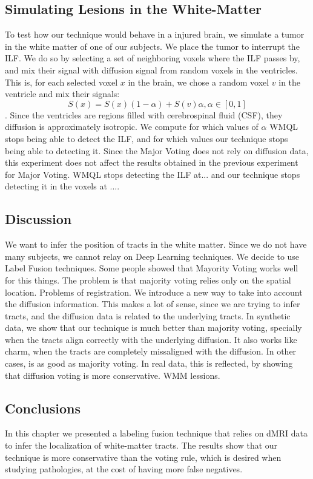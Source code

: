 \subsection{Simulating Lesions in the White-Matter}
To test how our technique would behave in a injured brain, we simulate a tumor in the white matter of one of our subjects. We place the tumor to interrupt the ILF. We do so by selecting a set of neighboring voxels where the ILF passes by, and mix their signal with diffusion signal from random voxels in the ventricles. This is, for each selected voxel $x$ in the brain, we chose a random voxel $v$ in the ventricle and mix their signals:
$$S(x) = S(x)(1-\alpha) + S(v)\alpha, \alpha \in [0,1]$$.
Since the ventricles are regions filled with cerebrospinal fluid (CSF), they diffusion is approximately isotropic. We compute for which values of $\alpha$ WMQL stops being able to detect the ILF, and for which values our technique stops being able to detecting it. Since the Major Voting does not rely on diffusion data, this experiment does not affect the results obtained in the previous experiment for Major Voting.
WMQL stops detecting the ILF at... and our technique stops detecting it in the voxels at .... 

\subsection{Discussion}
We want to infer the position of tracts in the white matter.
Since we do not have many subjects, we cannot relay on Deep Learning techniques.
We decide to use Label Fusion techniques.
Some people showed that Mayority Voting works well for this things.
The problem is that majority voting relies only on the spatial location.
Problems of registration.
We introduce a new way to take into account the diffusion information.
This makes a lot of sense, since we are trying to infer tracts, and the 
diffusion data is related to the underlying tracts.
In synthetic data, we show that our technique is much better than
majority voting, specially when the tracts align correctly with the
underlying diffusion. It also works like charm, when the tracts are completely
missaligned with the diffusion. In other cases, is as good as majority voting.
In real data, this is reflected, by showing that diffusion voting is more
conservative. WMM lessions.

\subsection{Conclusions}
In this chapter we presented a labeling fusion technique that relies on dMRI
data to infer the localization of white-matter tracts. The results show that
our technique is more conservative than the voting rule, which is desired when
studying pathologies, at the cost of having more false negatives.

